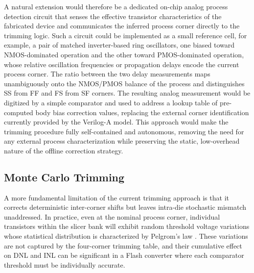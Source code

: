 A natural extension would therefore be a dedicated on-chip analog process
detection circuit that senses the effective transistor characteristics of the fabricated device
and communicates the inferred process corner directly to the trimming logic. Such a circuit could
be implemented as a small reference cell, for example, a pair of matched inverter-based ring
oscillators, one biased toward NMOS-dominated operation and the other toward PMOS-dominated
operation, whose relative oscillation frequencies or propagation delays encode the current
process corner. The ratio between the two delay measurements maps unambiguously onto the
NMOS/PMOS balance of the process and distinguishes SS from FF and FS from SF corners. The
resulting analog measurement would be digitized by a simple comparator and used to address a
lookup table of pre-computed body bias correction values, replacing the external corner
identification currently provided by the Verilog-A model. This approach would make the
trimming procedure fully self-contained and autonomous, removing the need for any external
process characterization while preserving the static, low-overhead nature of the offline correction
strategy.

\subsection{Monte Carlo Trimming}

A more fundamental limitation of the current trimming approach is that it corrects deterministic
inter-corner shifts but leaves intra-die stochastic mismatch unaddressed. In practice, even at the
nominal process corner, individual transistors within the slicer bank will exhibit random threshold
voltage variations whose statistical distribution is characterized by Pelgrom's law \cite{pelgrom_1989}. These
variations are not captured by the four-corner trimming table, and their cumulative effect on DNL
and INL can be significant in a Flash converter where each comparator threshold must be
individually accurate.

